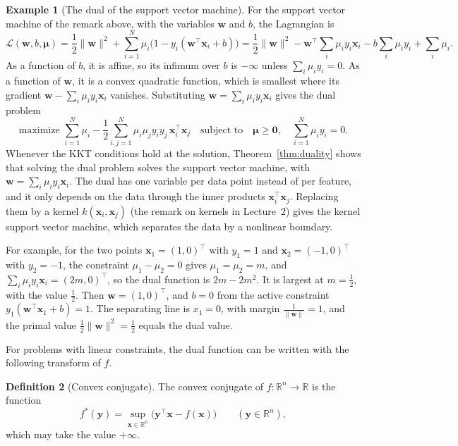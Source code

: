 \documentclass[11pt]{article}
\newcommand{\norm}[1]{\lVert #1 \rVert}
\theoremstyle{definition}
\newtheorem{definition}{Definition}[section]
\newtheorem{example}[definition]{Example}
\theoremstyle{plain}
\theoremstyle{remark}
\begin{document}
\begin{example}[The dual of the support vector machine]\label{ex:svm-dual}
    For the support vector machine of the remark above, with the variables $\mathbf{w}$ and $b$, the Lagrangian is
    \[\mathcal{L}(\mathbf{w}, b, \boldsymbol{\mu}) = \frac{1}{2}\norm{\mathbf{w}}^2 + \sum_{i=1}^N \mu_i\big(1 - y_i(\mathbf{w}^\top\mathbf{x}_i + b)\big) = \frac{1}{2}\norm{\mathbf{w}}^2 - \mathbf{w}^\top\sum_i \mu_iy_i\mathbf{x}_i - b\sum_i \mu_iy_i + \sum_i \mu_i.\]
    As a function of $b$, it is affine, so its infimum over $b$ is $-\infty$ unless $\sum_i \mu_iy_i = 0$. As a function of $\mathbf{w}$, it is a convex quadratic function, which is smallest where its gradient $\mathbf{w} - \sum_i \mu_iy_i\mathbf{x}_i$ vanishes. Substituting $\mathbf{w} = \sum_i \mu_iy_i\mathbf{x}_i$ gives the dual problem
    \[\text{maximize } \sum_{i=1}^N \mu_i - \frac{1}{2}\sum_{i, j = 1}^N \mu_i\mu_jy_iy_j\,\mathbf{x}_i^\top\mathbf{x}_j \quad \text{subject to} \quad \boldsymbol{\mu} \geq \mathbf{0}, \quad \sum_{i=1}^N \mu_iy_i = 0.\]
    Whenever the KKT conditions hold at the solution, Theorem~\ref{thm:duality} shows that solving the dual problem solves the support vector machine, with $\mathbf{w} = \sum_i \mu_iy_i\mathbf{x}_i$. The dual has one variable per data point instead of per feature, and it only depends on the data through the inner products $\mathbf{x}_i^\top\mathbf{x}_j$. Replacing them by a kernel $k(\mathbf{x}_i, \mathbf{x}_j)$ (the remark on kernels in Lecture~2) gives the kernel support vector machine, which separates the data by a nonlinear boundary.

    For example, for the two points $\mathbf{x}_1 = (1, 0)^\top$ with $y_1 = 1$ and $\mathbf{x}_2 = (-1, 0)^\top$ with $y_2 = -1$, the constraint $\mu_1 - \mu_2 = 0$ gives $\mu_1 = \mu_2 = m$, and $\sum_i \mu_iy_i\mathbf{x}_i = (2m, 0)^\top$, so the dual function is $2m - 2m^2$. It is largest at $m = \frac{1}{2}$, with the value $\frac{1}{2}$. Then $\mathbf{w} = (1, 0)^\top$, and $b = 0$ from the active constraint $y_1(\mathbf{w}^\top\mathbf{x}_1 + b) = 1$. The separating line is $x_1 = 0$, with margin $\frac{1}{\norm{\mathbf{w}}} = 1$, and the primal value $\frac{1}{2}\norm{\mathbf{w}}^2 = \frac{1}{2}$ equals the dual value.
\end{example}

For problems with linear constraints, the dual function can be written with the following transform of $f$.

\begin{definition}[Convex conjugate]\label{def:conjugate}
    The convex conjugate of $f: \mathbb{R}^n \to \mathbb{R}$ is the function
    \[f^*(\mathbf{y}) = \sup_{\mathbf{x} \in \mathbb{R}^n} \big(\mathbf{y}^\top\mathbf{x} - f(\mathbf{x})\big) \qquad (\mathbf{y} \in \mathbb{R}^n),\]
    which may take the value $+\infty$.
\end{definition}
\end{document}
